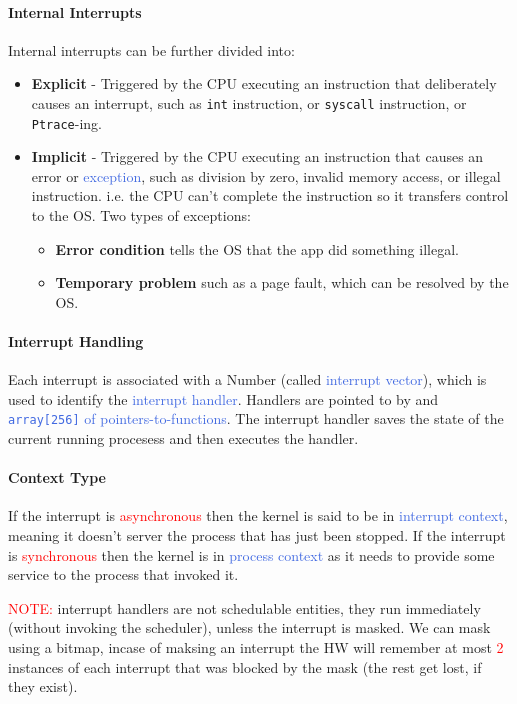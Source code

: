 \documentclass[openany,12pt]{book}
\newcommand{\code}[1]{\texttt{#1}}
\newcommand{\red}[1]{\textcolor{Red}{#1}}
\newcommand{\blue}[1]{\textcolor{RoyalBlue}{#1}}
\begin{document}
\paragraph{Internal Interrupts} Internal interrupts can be further divided into:
\begin{itemize}
  \item \textbf{Explicit} - Triggered by the CPU executing an instruction that deliberately causes an interrupt, such as \code{int} instruction, or \code{syscall} instruction, or \code{Ptrace}-ing.

  \item \textbf{Implicit} - Triggered by the CPU executing an instruction that causes an error or \blue{exception}, such as division by zero, invalid memory access, or illegal instruction. i.e. the CPU can't complete the instruction so it transfers control to the OS. Two types of exceptions:
  \begin{itemize}
    \item \textbf{Error condition} tells the OS that the app did something illegal.
    \item \textbf{Temporary problem} such as a page fault, which can be resolved by the OS.
  \end{itemize}
\end{itemize}


\paragraph{Interrupt Handling} Each interrupt is associated with a Number (called \blue{interrupt vector}), which is used to identify the \blue{interrupt handler}. Handlers are pointed to by and \blue{\code{array[256]} of pointers-to-functions}. The interrupt handler saves the state of the current running procesess and then executes the handler.

\paragraph{Context Type} If the interrupt is \red{asynchronous} then the kernel is said to be in \blue{interrupt context}, meaning it doesn't server the process that has just been stopped. If the interrupt is \red{synchronous} then the kernel is in \blue{process context} as it needs to provide some service to the process that invoked it.


\vspace*{0.5em}

\red{NOTE:} interrupt handlers are not schedulable entities, they run immediately (without invoking the scheduler), unless the interrupt is masked. We can mask using a bitmap, incase of maksing an interrupt the HW will remember at most \red{2} instances of each interrupt that was blocked by the mask (the rest get lost, if they exist).
\end{document}
